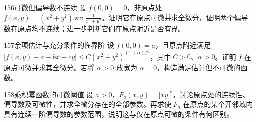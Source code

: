 \begin{exercise}{156}{可微但偏导数不连续}
设 $f(0,0)=0$，非原点处 $f(x,y)=(x^2+y^2)\sin\frac1{x^2+y^2}$。证明它在原点可微并求全微分，证明两个偏导数在原点均不连续；进一步判断它们在原点附近是否有界。
\end{exercise}
\begin{exercise}{157}{余项估计与充分条件的临界阶}
设 $f(0,0)=a$，且原点附近满足 $|f(x,y)-a-bx-cy|\le C(x^2+y^2)^{(1+\alpha)/2}$，其中 $C>0$、$\alpha>0$。证明 $f$ 在原点可微并求其全微分。若将 $\alpha>0$ 放宽为 $\alpha=0$，构造满足估计但不可微的函数。
\end{exercise}
\begin{exercise}{158}{乘积幂函数的可微阈值}
设 $a>0$，$F_a(x,y)=|xy|^a$。讨论原点处的连续性、偏导数及可微性，并求全微分存在的全部参数。再求使 $F_a$ 在原点的某个开邻域内具有连续一阶偏导数的参数范围，说明这与仅在原点可微的条件有何区别。
\end{exercise}
